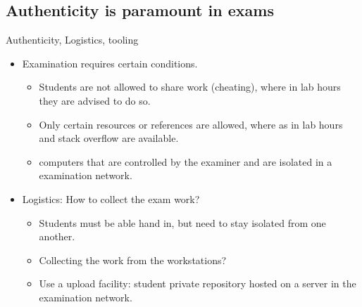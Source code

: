 \subsection[Authenticity]{Authenticity is paramount in exams}
\begin{frame}{Authenticity, Logistics, tooling}
  \begin{itemize}
  \item Examination requires certain conditions.
    \begin{itemize}
    \item Students are not allowed to share work (cheating), where in lab hours
      they are advised to do so.
    \item Only certain resources or references are allowed, where as
      in lab hours  and \alert{stack overflow} are available.
    \item {} computers that are controlled by the examiner and
      are isolated in a examination network.
    \end{itemize}
  \item Logistics: How to collect the exam work?
    \begin{itemize}
    \item Students must be able hand in, but need to stay isolated from one another.
    \item Collecting the work from the workstations?

    \item Use a upload facility: student private repository hosted on
      a server in the examination network.
    \end{itemize}
  \end{itemize}
\end{frame}


